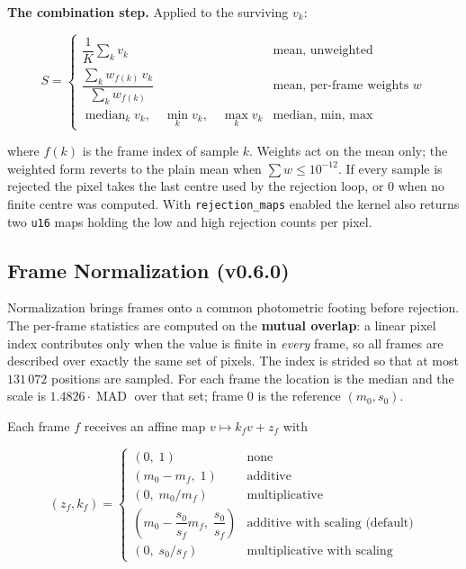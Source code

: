 \documentclass[11pt,a4paper]{article}
\newcommand{\code}[1]{\texttt{\small #1}}
\begin{document}
    \textbf{The combination step.} Applied to the surviving $v_k$:

    \begin{equation}
        S = \begin{cases}
            \dfrac{1}{K}\displaystyle\sum_{k} v_k & \text{mean, unweighted} \\[12pt]
            \dfrac{\sum_{k} w_{f(k)} \, v_k}{\sum_{k} w_{f(k)}} & \text{mean, per-frame weights } w \\[12pt]
            \operatorname{median}_k v_k, \quad \min_k v_k, \quad \max_k v_k & \text{median, min, max}
        \end{cases}
    \end{equation}

    where $f(k)$ is the frame index of sample $k$. Weights act on the mean only; the weighted form reverts to the plain mean when $\sum w \le 10^{-12}$. If every sample is rejected the pixel takes the last centre used by the rejection loop, or $0$ when no finite centre was computed. With \code{rejection\_maps} enabled the kernel also returns two \code{u16} maps holding the low and high rejection counts per pixel.

    \subsection{Frame Normalization (v0.6.0)}
    \label{sec:frame_normalization}

    Normalization brings frames onto a common photometric footing before rejection. The per-frame statistics are computed on the \textbf{mutual overlap}: a linear pixel index contributes only when the value is finite in \emph{every} frame, so all frames are described over exactly the same set of pixels. The index is strided so that at most $131\,072$ positions are sampled. For each frame the location is the median and the scale is $1.4826 \cdot \operatorname{MAD}$ over that set; frame 0 is the reference $(m_0, s_0)$.

    Each frame $f$ receives an affine map $v \mapsto k_f v + z_f$ with

    \begin{equation}
        (z_f, k_f) = \begin{cases}
            (0,\; 1) & \text{none} \\[4pt]
            (m_0 - m_f,\; 1) & \text{additive} \\[4pt]
            \left(0,\; m_0 / m_f\right) & \text{multiplicative} \\[4pt]
            \left(m_0 - \dfrac{s_0}{s_f} m_f,\; \dfrac{s_0}{s_f}\right) & \text{additive with scaling (default)} \\[10pt]
            \left(0,\; s_0 / s_f\right) & \text{multiplicative with scaling}
        \end{cases}
    \end{equation}
\end{document}
